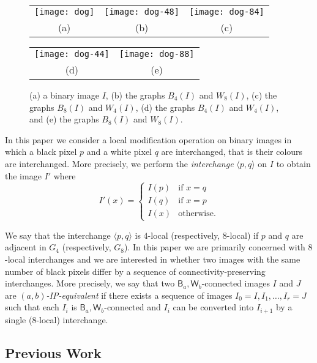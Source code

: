 \documentclass[lotsofwhite,charterfonts]{patmorin}
\newcommand{\ic}[2]{\langle #1,#2 \rangle}
\begin{document}
\begin{figure}[htbp]
\begin{center}\begin{tabular}{ccc}
\texttt{[image: dog]} & 
\texttt{[image: dog-48]} &
\texttt{[image: dog-84]} \\
(a) & (b) & (c) \\
\end{tabular}\end{center}
\begin{center}\begin{tabular}{cc}
\texttt{[image: dog-44]} & \texttt{[image: dog-88]} \\
(d) & (e) \\
\end{tabular}\end{center}
\caption{(a) a binary image $I$, (b) the graphs $B_4(I)$ and $W_8(I)$, (c)
the graphs $B_8(I)$ and $W_4(I)$, (d) the graphs $B_4(I)$ and $W_4(I)$, and (e) the graphs $B_8(I)$ and $W_8(I)$.}
\end{figure}


In this paper we consider a local modification operation on binary
images in which a black pixel $p$ and a white pixel $q$ are
interchanged, that is their colours are interchanged.  More precisely, we perform the \emph{interchange}
$\ic{p}{q}$ on $I$ to obtain the image $I'$ where
\[
     I'(x) = \left\{\begin{array}{ll}
         I(p) & \mbox{if $x=q$} \\
         I(q) & \mbox{if $x=p$} \\
         I(x) & \mbox{otherwise.}\end{array}\right.
\]

We say that the interchange $\ic{p}{q}$ is $4$-local (respectively,
$8$-local) if $p$ and $q$ are adjacent in $G_4$ (respectively, $G_8$).
In this paper we are primarily concerned with $8$-local interchanges
and we are interested in whether two images with the same number of
black pixels differ by a sequence of connectivity-preserving
interchanges.  More precisely, we say that two $\textsf{B}_a,\textsf{W}_b$-connected images $I$ and $J$ are \emph{$(a,b)$-IP-equivalent}
\cite{rn02} if there exists a sequence of images $I_0=I,I_1,\ldots,I_r=J$ such that each $I_i$ is $\textsf{B}_a,\textsf{W}_b$-connected and $I_{i}$ can be converted into $I_{i+1}$ by a single (8-local) interchange.

\subsection{Previous Work}
\end{document}
